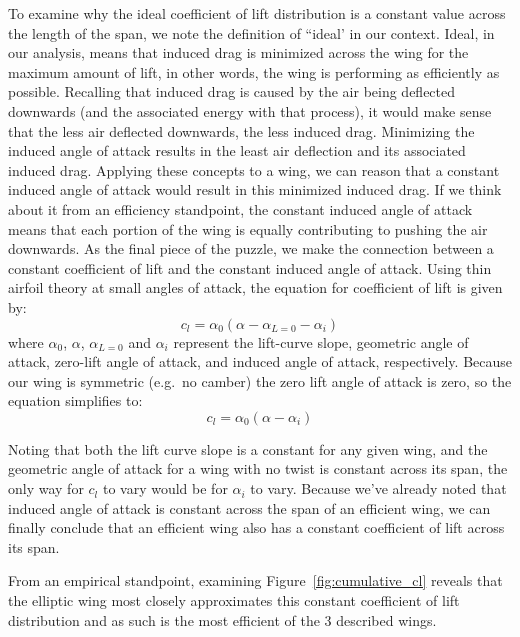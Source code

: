 \documentclass{report}
\begin{document}
To examine why the ideal coefficient of lift distribution is a constant value across the length of the span, we note the definition of ``ideal' in our context. Ideal, in our analysis, means that induced drag is minimized across the wing for the maximum amount of lift, in other words, the wing is performing as efficiently as possible. Recalling that induced drag is caused by the air being deflected downwards (and the associated energy with that process), it would make sense that the less air deflected downwards, the less induced drag.
Minimizing the induced angle of attack results in the least air deflection and its associated induced drag. Applying these concepts to a wing, we can reason that a constant induced angle of attack would result in this minimized induced drag. If we think about it from an efficiency standpoint, the constant induced angle of attack means that each portion of the wing is equally contributing to pushing the air downwards. As the final piece of the puzzle, we make the connection between a constant coefficient of lift and the constant induced angle of attack.
Using thin airfoil theory at small angles of attack, the equation for coefficient of lift is given by:
\begin{equation}\label{eq:coefficient_of_lift}
c_l = \alpha_0(\alpha - \alpha_{L=0} -\alpha_i)
\end{equation}
where $\alpha_0$, $\alpha$, $\alpha_{L=0}$ and $\alpha_i$ represent the lift-curve slope, geometric angle of attack, zero-lift angle of attack, and induced angle of attack, respectively. 
Because our wing is symmetric (e.g.\ no camber) the zero lift angle of attack is zero, so the equation simplifies to:
\begin{equation}\label{eq:coefficient_of_lift_final}
c_l = \alpha_0(\alpha -\alpha_i)
\end{equation}

Noting that both the lift curve slope is a constant for any given wing, and the geometric angle of attack for a wing with no twist is constant across its span, the only way for $c_l$ to vary would be for $\alpha_i$ to vary. Because we've already noted that induced angle of attack is constant across the span of an efficient wing, we can finally conclude that an efficient wing also has a constant coefficient of lift across its span.

From an empirical standpoint, examining Figure~\ref{fig:cumulative_cl} reveals that the elliptic wing most closely approximates this constant coefficient of lift distribution and as such is the most efficient of the 3 described wings.
\end{document}
